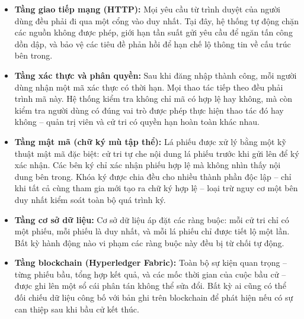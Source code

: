 \begin{itemize}
    \item \textbf{Tầng giao tiếp mạng (HTTP):} Mọi yêu cầu từ trình duyệt của người dùng đều phải đi qua một cổng vào duy nhất. Tại đây, hệ thống tự động chặn các nguồn không được phép, giới hạn tần suất gửi yêu cầu để ngăn tấn công dồn dập, và bảo vệ các tiêu đề phản hồi để hạn chế lộ thông tin về cấu trúc bên trong.

    \item \textbf{Tầng xác thực và phân quyền:} Sau khi đăng nhập thành công, mỗi người dùng nhận một mã xác thực có thời hạn. Mọi thao tác tiếp theo đều phải trình mã này. Hệ thống kiểm tra không chỉ mã có hợp lệ hay không, mà còn kiểm tra người dùng có đúng vai trò được phép thực hiện thao tác đó hay không -- quản trị viên và cử tri có quyền hạn hoàn toàn khác nhau.

    \item \textbf{Tầng mật mã (chữ ký mù tập thể):} Lá phiếu được xử lý bằng một kỹ thuật mật mã đặc biệt: cử tri tự che nội dung lá phiếu trước khi gửi lên để ký xác nhận. Các bên ký chỉ xác nhận phiếu hợp lệ mà không nhìn thấy nội dung bên trong. Khóa ký được chia đều cho nhiều thành phần độc lập -- chỉ khi tất cả cùng tham gia mới tạo ra chữ ký hợp lệ -- loại trừ nguy cơ một bên duy nhất kiểm soát toàn bộ quá trình ký.

    \item \textbf{Tầng cơ sở dữ liệu:} Cơ sở dữ liệu áp đặt các ràng buộc: mỗi cử tri chỉ có một phiếu, mỗi phiếu là duy nhất, và mỗi lá phiếu chỉ được tiết lộ một lần. Bất kỳ hành động nào vi phạm các ràng buộc này đều bị từ chối tự động.

    \item \textbf{Tầng blockchain (Hyperledger Fabric):} Toàn bộ sự kiện quan trọng -- từng phiếu bầu, tổng hợp kết quả, và các mốc thời gian của cuộc bầu cử -- được ghi lên một sổ cái phân tán không thể sửa đổi. Bất kỳ ai cũng có thể đối chiếu dữ liệu công bố với bản ghi trên blockchain để phát hiện nếu có sự can thiệp sau khi bầu cử kết thúc.
\end{itemize}
